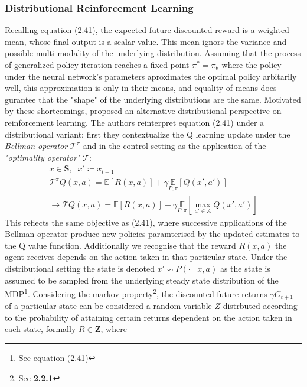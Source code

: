\subsubsection{Distributional Reinforcement Learning}
Recalling equation (2.41), the expected future discounted reward is a weighted mean,
whose final output is a scalar value. This mean ignors the variance and possible multi-modality
of the underlying distribution. Assuming that the process of generalized policy iteration
reaches a fixed point $\pi^* = \pi_\theta$ where the policy under the neural network's parameters
aproximates the optimal policy arbitarily well, this approximation is only in their means, and equality
of means does gurantee that the "shape" of the underlying distributions are the same.
Motivated by these shortcomings, \cite{Bellemare2017} proposed an alternative distributional perspective
on reinforcement learning. The authors reinterpret equation (2.41) under a distributional variant;
first they contextualize the Q learning update under the \emph{Bellman operator} $\mathcal{T}^\pi$ and in the control setting
as the application of the \emph{"optimality operator"} $\mathcal{T}$:
\begin{equation}
    \begin{gathered}
        x \in \mathbf{S}, \;\; x' \coloneqq x_{t+1}\\
        \mathcal{T}^\pi Q(x,a) = \mathbb{E}[R(x,a)] + \gamma \underset{P,\pi}{\mathbb{E}} [Q(x',a')] \\
        \rightarrow \mathcal{T} Q(x,a) = \mathbb{E}[R(x,a)] + \gamma \underset{P,\pi}{\mathbb{E}} [\max_{a' \in A}Q(x',a')]
    \end{gathered}
\end{equation}
This reflects the same objective as (2.41), where successive applications of the Bellman operator
produce new policies paramterised by the updated estimates to the Q value function. Additionally we recognise
that the reward $R(x,a)$ the agent receives depends on the action taken in that particular state. Under the
distributional setting the state is denoted $x' \backsim P( \cdot \mid x, a)$ as the state is assumed
to be sampled from the underlying steady state distribution of the MDP\footnote{See equation (2.41)}.
Considering the markov property\footnote{See \textbf{2.2.1}}, the discounted future returns $\gamma G_{t+1}$ of a particular state
can be considered a random variable $Z$ distrbuted according to the probability of attaining
certain returns dependent on the action taken in each state, formally $R \in \mathbf{Z}$, where
